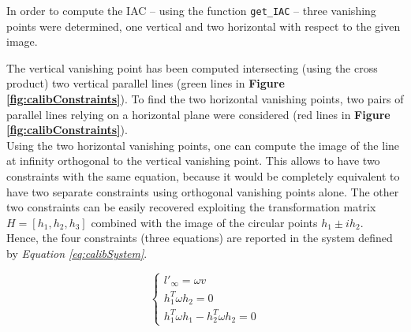 \documentclass[12pt,a4paper]{article}
\begin{document}
In order to compute the IAC -- using the function \verb|get_IAC| -- three vanishing points were determined, one vertical and two horizontal with respect to the given image.

\pagebreak

The vertical vanishing point has been computed intersecting (using the cross product) two vertical parallel lines (green lines in \textbf{Figure \ref{fig:calibConstraints}}). To find the two horizontal vanishing points, two pairs of parallel lines relying on a horizontal plane were considered (red lines in \textbf{Figure \ref{fig:calibConstraints}}).\\

Using the two horizontal vanishing points, one can compute the image of the line at infinity orthogonal to the vertical vanishing point. This allows to have two constraints with the same equation, because it would be completely equivalent to have two separate constraints using orthogonal vanishing points alone. The other two constraints can be easily recovered exploiting the transformation matrix $H = [h_1,h_2,h_3]$ combined with the image of the circular points $h_1 \pm ih_2$.\\

Hence, the four constraints (three equations) are reported in the system defined by \textit{Equation \ref{eq:calibSystem}}.

\begin{equation}
    \begin{cases}
        l'_\infty = \omega v\\
        h_1^T\omega h_2 = 0\\
        h_1^T\omega h_1 - h_2^T\omega h_2 = 0
    \end{cases}
    \label{eq:calibSystem}
\end{equation}
\end{document}
